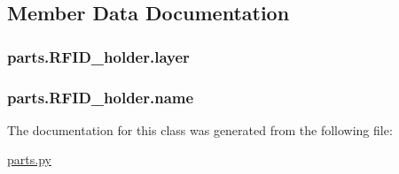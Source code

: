 \subsection{Member Data Documentation}
\hypertarget{classparts_1_1_r_f_i_d__holder_aaf5a99086a6b558117e5d126290b51ed}{}
\subsubsection[{layer}]{\setlength{\rightskip}{0pt plus 5cm}parts.\+R\+F\+I\+D\+\_\+holder.\+layer}\label{classparts_1_1_r_f_i_d__holder_aaf5a99086a6b558117e5d126290b51ed}
\hypertarget{classparts_1_1_r_f_i_d__holder_a49212514e6af1f07c8774e677fab84ba}{}
\subsubsection[{name}]{\setlength{\rightskip}{0pt plus 5cm}parts.\+R\+F\+I\+D\+\_\+holder.\+name}\label{classparts_1_1_r_f_i_d__holder_a49212514e6af1f07c8774e677fab84ba}


The documentation for this class was generated from the following file\+:\begin{DoxyCompactItemize}
\item 
\hyperlink{parts_8py}{parts.\+py}\end{DoxyCompactItemize}
